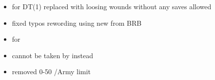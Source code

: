 

\subtitle{2023 \betaname{} 2 \hotfixname{} 1}

\begin{itemize}
	\item \chainedtogether{} for \shackledslaves{} DT(1) replaced with loosing \Dsix{} wounds without any saves allowed
\end{itemize}

\subtitle{2023 \betaname{} 2}

\begin{itemize}
	\item fixed typos \wordand{} rewording using new \ATrules{} from BRB
	\item \chainedtogether{} for \shackledslaves
	\item \breathofthebrassbull{} cannot be taken by \flymovementlabel{} instead \exclusive{}
	\item \disciplesoflugar{} removed 0-50 \model/Army limit
\end{itemize}


